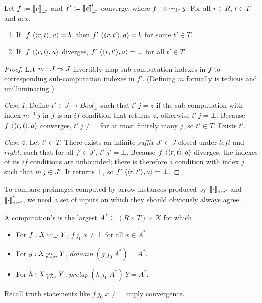 \documentclass[preprint]{sigplanconf}
\newcommand{\arrow}{\rightsquigarrow}
\newcommand{\pbot}{{\bot^{\mspace{-4mu}*}}}
\DeclareMathOperator{\pbotto}{\arrow_{\mspace{-3mu}\pbot}}
\DeclareMathOperator{\pmapto}{\arrow_{\mspace{-22mu}_{\mathrm{map*}}}}
\newcommand{\ppre}{_\mathrm{pre^{\mspace{-2mu}*}}}
\DeclareMathOperator{\ppreto}{\arrow_{\mspace{-19mu}_{\mathrm{pre*}}}}
\begin{document}
\begin{theorem}
Let $f := \meaningof{\mathit{e}}_\pbot$ and $f' := \meaningof{\mathit{e}}_\pbot'$ converge, where $f : x \pbotto y$.
For all $r \in R$, $t \in T$ and $a : x$,
\begin{enumerate}
	\item If $~f~\langle{\langle{r,t}\rangle,a}\rangle = b$, then $f'~\langle{\langle{r,t'}\rangle,a}\rangle = b$ for some $t' \in T$.
	\item If $~f~\langle{\langle{r,t}\rangle,a}\rangle$ diverges, $f'~\langle{\langle{r,t'}\rangle,a}\rangle = \bot$ for all $t' \in T$.
\end{enumerate}
\end{theorem}
\begin{proof}
Let $m : J \Rightarrow J$ invertibly map sub-computation indexes in $f$ to corresponding sub-computation indexes in $f'$.
(Defining $m$ formally is tedious and unilluminating.)

\emph{Case 1.}
Define $t' \in J \to Bool_\bot$ such that $t'~j = z$ if the sub-computation with index $m^{-1}~j$ in $f$ is an $if$ condition that returns $z$, otherwise $t'~j = \bot$.
Because $f~\langle{\langle{r,t}\rangle,a}\rangle$ converges, $t'~j \neq \bot$ for at most finitely many $j$, so $t' \in T$.
Exists $t'$.

\emph{Case 2.}
Let $t' \in T$.
There exists an infinite \emph{suffix} $J' \subset J$ closed under $left$ and $right$, such that for all $j' \in J'$, $t'~j' = \bot$.
Because $f~\langle{\langle{r,t}\rangle,a}\rangle$ diverges, the indexes of its $if$ conditions are unbounded; there is therefore a condition with index $j$ such that $m~j \in J'$.
It returns $\bot$, so $f'~\langle{\langle{r,t'}\rangle,a}\rangle = \bot$.
\end{proof}

To compare preimages computed by arrow instances produced by $\meaningof{\cdot}\ppre$ and $\meaningof{\cdot}\ppre'$, we need a set of inputs on which they should obviously always agree.

\begin{definition}
A computation's  is the largest $A^* \subseteq (R \times T) \times X$ for which
\begin{itemize}
	\item For $f : X \pbotto Y$, $f~j_0~x \neq \bot$ for all $x \in A^*$.
	\item For $g : X \pmapto Y$, $domain~(g~j_0~A^*) = A^*$.
	\item For $h : X \ppreto Y$, $pre!ap~(h~j_0~A^*)~Y = A^*$.
\end{itemize}
Recall truth statements like $f~j_0~x \neq \bot$ imply convergence.
\end{definition}
\end{document}
